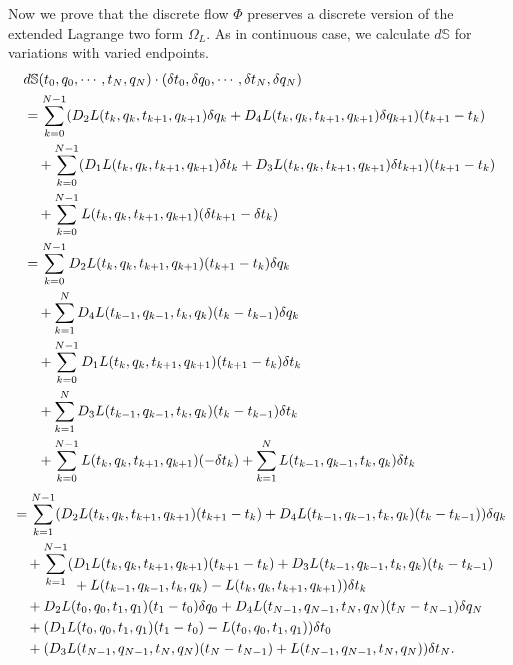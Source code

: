 \documentclass[a4paper,a4paper]{article}
\begin{document}
Now we prove that the discrete flow $\Phi$ preserves a discrete
version of the extended Lagrange two form $\Omega_{L}$. %
As in continuous case,
we calculate $d\mathbb{S}$ for variations with varied endpoints.
\begin{align}
 &d\mathbb{S}(t_{0}, q_{0}, \cdots, t_{N}, q_{N})\cdot (\delta t_{0}, \delta q_{0},
      \cdots, \delta t_{N}, \delta q_{N})\notag \\
  &=\sum_{k=0}^{N-1}(D_{2}L(t_{k}, q_{k}, t_{k+1}, q_{k+1})\delta q_{k}+
        D_{4}L(t_{k}, q_{k}, t_{k+1}, q_{k+1})\delta q_{k+1})(t_{k+1}-t_{k})\notag \\
     &\quad + \sum_{k=0}^{N-1}(D_{1}L(t_{k}, q_{k}, t_{k+1}, q_{k+1})\delta t_{k}+
        D_{3}L(t_{k}, q_{k}, t_{k+1}, q_{k+1})\delta t_{k+1})(t_{k+1}-t_{k})\notag \\
     &\quad + \sum_{k=0}^{N-1}L(t_{k}, q_{k}, t_{k+1}, q_{k+1})(\delta t_{k+1}
       -\delta t_{k})\notag\\
  &=\sum_{k=0}^{N-1}D_{2}L(t_{k}, q_{k}, t_{k+1}, q_{k+1})(t_{k+1}-t_{k})\delta q_{k}
     \notag\\
     &\quad +\sum_{k=1}^{N} D_{4}L(t_{k-1}, q_{k-1}, t_{k}, q_{k})
          (t_{k}-t_{k-1})\delta q_{k}\notag \\
     &\quad +\sum_{k=0}^{N-1}D_{1}L(t_{k}, q_{k}, t_{k+1}, q_{k+1})(t_{k+1}-t_{k})
        \delta t_{k}\notag \\
     &\quad +\sum_{k=1}^{N} D_{3}L(t_{k-1}, q_{k-1}, t_{k}, q_{k})(t_{k}-t_{k-1})
        \delta t_{k}\notag \\
     &\quad + \sum_{k=0}^{N-1}L(t_{k}, q_{k}, t_{k+1}, q_{k+1})(-\delta t_{k})
       +\sum_{k=1}^{N}L(t_{k-1}, q_{k-1}, t_{k}, q_{k})\delta t_{k}\notag
       \end{align}
       \begin{align}
  &=\sum_{k=1}^{N-1}(D_{2}L(t_{k}, q_{k}, t_{k+1}, q_{k+1})(t_{k+1}-t_{k})
                     +D_{4}L(t_{k-1}, q_{k-1}, t_{k}, q_{k})
                     (t_{k}-t_{k-1}))\delta q_{k}\notag\\
    &\quad +\sum_{k=1}^{N-1}(D_{1}L(t_{k}, q_{k}, t_{k+1}, q_{k+1})(t_{k+1}-t_{k})
                     +D_{3}L(t_{k-1}, q_{k-1}, t_{k}, q_{k})
                     (t_{k}-t_{k-1})\notag\\[-10pt]
       &\quad \quad\quad \quad \,\,+L(t_{k-1}, q_{k-1}, t_{k}, q_{k})
      -L(t_{k}, q_{k}, t_{k+1}, q_{k+1}))\delta t_{k}\notag\\
    &\quad +D_{2}L(t_{0}, q_{0}, t_{1}, q_{1})(t_{1}-t_{0})\delta q_{0}
           +D_{4}L(t_{N-1}, q_{N-1}, t_{N}, q_{N})(t_{N}-t_{N-1})\delta q_{N}\notag\\
    &\quad +(D_{1}L(t_{0}, q_{0}, t_{1}, q_{1})(t_{1}-t_{0})
               -L(t_{0}, q_{0}, t_{1}, q_{1}))\delta t_{0}\notag\\
     &\quad  +(D_{3}L(t_{N-1}, q_{N-1}, t_{N}, q_{N})(t_{N}-t_{N-1})
               +L(t_{N-1}, q_{N-1}, t_{N}, q_{N}))\delta t_{N}. \label{3.8}
\end{align}
\end{document}
